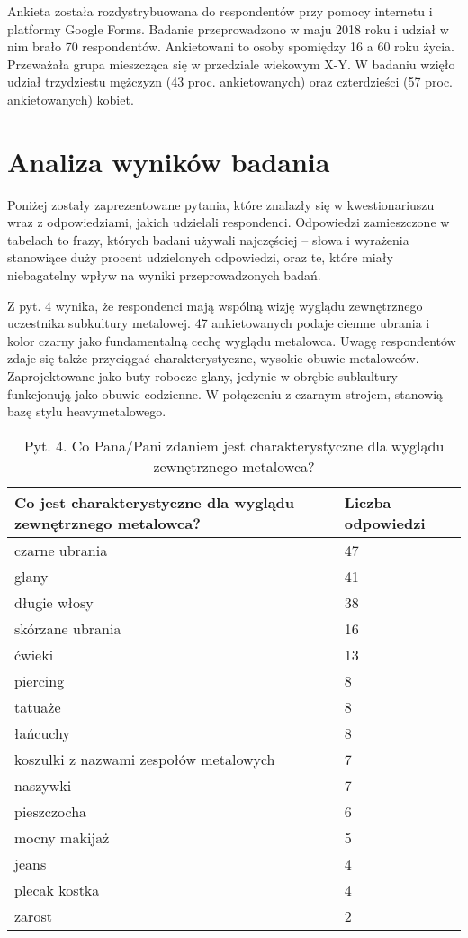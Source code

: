 \documentclass[12pt, a4paper, titlepage]{report}
\begin{document}
Ankieta została rozdystrybuowana do respondentów przy pomocy internetu i platformy Google Forms. Badanie przeprowadzono w maju 2018 roku i udział w nim brało 70 respondentów. Ankietowani to osoby spomiędzy 16 a 60 roku życia. Przeważała grupa mieszcząca się w przedziale wiekowym X-Y. W badaniu wzięło udział trzydziestu mężczyzn (43 proc. ankietowanych) oraz czterdzieści (57 proc. ankietowanych) kobiet. 

\section{Analiza wyników badania}
Poniżej zostały zaprezentowane pytania, które znalazły się w kwestionariuszu wraz z odpowiedziami, jakich udzielali respondenci. Odpowiedzi zamieszczone w tabelach to frazy, których badani używali najczęściej -- słowa i wyrażenia stanowiące duży procent udzielonych odpowiedzi, oraz te, które miały niebagatelny wpływ na wyniki przeprowadzonych badań. 

Z pyt. 4 wynika, że respondenci mają wspólną wizję wyglądu zewnętrznego uczestnika subkultury metalowej. 47 ankietowanych podaje ciemne ubrania i kolor czarny jako fundamentalną cechę wyglądu metalowca. Uwagę respondentów zdaje się także przyciągać charakterystyczne, wysokie obuwie metalowców. Zaprojektowane jako buty robocze glany, jedynie w obrębie subkultury funkcjonują jako obuwie codzienne. W połączeniu z czarnym strojem, stanowią bazę stylu heavymetalowego.

\begin{table}
\begin{tabular}{ m{23em} | m{5em} } 
\textbf{Co jest charakterystyczne dla wyglądu zewnętrznego metalowca?} & Liczba odpowiedzi \\
\hline
czarne ubrania & 47 \\
glany & 41 \\
długie włosy & 38 \\
skórzane ubrania & 16 \\
ćwieki & 13 \\
piercing & 8 \\
tatuaże & 8 \\
łańcuchy & 8 \\
koszulki z nazwami zespołów metalowych & 7 \\
naszywki & 7 \\
pieszczocha & 6 \\
mocny makijaż & 5 \\
jeans & 4 \\
plecak kostka & 4 \\
zarost & 2 \\
\end{tabular} 
\caption{Pyt. 4. Co Pana/Pani zdaniem jest charakterystyczne dla wyglądu zewnętrznego metalowca?}
\label{table:1}
\end{table}
\end{document}
